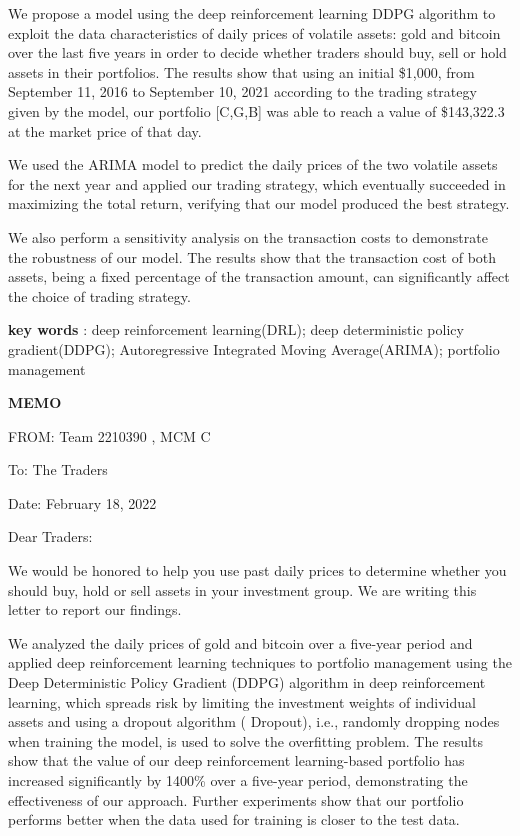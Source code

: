 \documentclass[13pt]{ctexart}
\begin{document}
\begin{adjustwidth}{1cm}{1cm}
\indent { }{ }{ }{ }{ }{}

We propose a model using the deep reinforcement learning DDPG\cite{2019} algorithm to exploit the data characteristics of daily prices of volatile assets: gold and bitcoin over the last five years in order to decide whether traders should buy, sell or hold assets in their portfolios. The results show that using an initial \$1,000, from September 11, 2016 to September 10, 2021 according to the trading strategy given by the model, our portfolio [C,G,B] was able to reach a value of \$143,322.3 at the market price of that day.

We used the ARIMA model to predict the daily prices of the two volatile assets for the next year and applied our trading strategy, which eventually succeeded in maximizing the total return, verifying that our model produced the best strategy.

We also perform a sensitivity analysis on the transaction costs to demonstrate the robustness of our model. The results show that the transaction cost of both assets, being a fixed percentage of the transaction amount, can significantly affect the choice of trading strategy.


\vspace{15pt}
\textbf{key words} : deep reinforcement learning(DRL); deep deterministic policy gradient(DDPG); Autoregressive Integrated Moving Average(ARIMA); portfolio management
\end{adjustwidth} 

\setmainfont{TeX Gyre Pagella}
\newpage
{}
\thispagestyle{empty}

{\centering \fontsize{18pt}{14pt}\selectfont \textbf{MEMO}\par}

\noindent FROM: Team {} 2210390 , MCM C

\noindent To: The Traders

\noindent Date: February 18, 2022

\vspace{10pt}
\noindent
Dear Traders:

We would be honored to help you use past daily prices to determine whether you should buy, hold or sell assets in your investment group. We are writing this letter to report our findings.

We analyzed the daily prices of gold and bitcoin over a five-year period and applied deep reinforcement learning techniques to portfolio management using the Deep Deterministic Policy Gradient (DDPG) algorithm in deep reinforcement learning, which spreads risk by limiting the investment weights of individual assets and using a dropout algorithm ( Dropout), i.e., randomly dropping nodes when training the model, is used to solve the overfitting problem. The results show that the value of our deep reinforcement learning-based portfolio has increased significantly by 1400\% over a five-year period, demonstrating the effectiveness of our approach. Further experiments show that our portfolio performs better when the data used for training is closer to the test data.  
\end{document}
